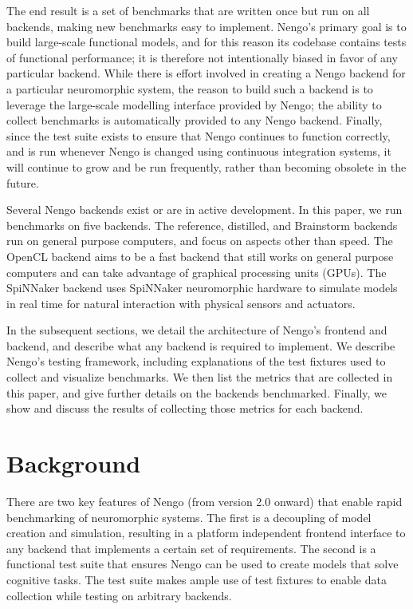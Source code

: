 \documentclass{frontiersSCNS}
\begin{document}
The end result is a set of benchmarks that
are written once but run on all backends,
making new benchmarks easy to implement.
Nengo's primary goal is to
build large-scale functional models,
and for this reason its codebase contains
tests of functional performance;
it is therefore not intentionally
biased in favor of any particular backend.
While there is effort involved in creating
a Nengo backend for a particular neuromorphic system,
the reason to build such a backend
is to leverage the large-scale modelling interface
provided by Nengo;
the ability to collect benchmarks
is automatically provided to any Nengo backend.
Finally, since the test suite exists
to ensure that Nengo continues to function
correctly, and is run whenever Nengo is changed using
continuous integration systems,
it will continue to grow and be run frequently,
rather than becoming obsolete in the future.

Several Nengo backends exist or are in active development.
In this paper, we run benchmarks
on five backends.
The reference, distilled, and Brainstorm backends
run on general purpose computers,
and focus on aspects other than speed.
The OpenCL backend aims to be a fast backend
that still works on general purpose computers
and can take advantage of
graphical processing units (GPUs).
The SpiNNaker backend uses
SpiNNaker neuromorphic hardware to
simulate models in real time
for natural interaction with
physical sensors and actuators.

In the subsequent sections,
we detail the architecture of Nengo's
frontend and backend,
and describe what any backend
is required to implement.
We describe Nengo's testing framework,
including explanations of the test fixtures
used to collect and visualize benchmarks.
We then list the metrics
that are collected in this paper,
and give further details on the backends benchmarked.
Finally, we show and discuss
the results of collecting those metrics
for each backend.

\section{Background}

There are two key features of Nengo
(from version 2.0 onward)
that enable rapid benchmarking of neuromorphic systems.
The first is a decoupling of model creation and simulation,
resulting in a platform independent frontend interface
to any backend that implements a certain set of requirements.
The second is a functional test suite that ensures
Nengo can be used to create models that solve cognitive tasks.
The test suite makes ample use of test fixtures
to enable data collection while testing on arbitrary backends.
\end{document}
